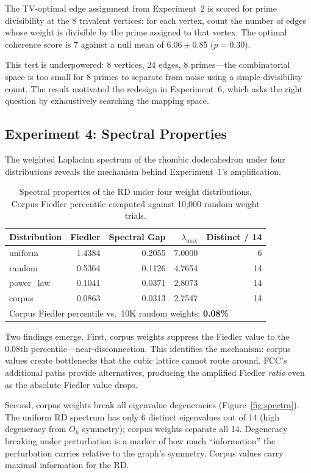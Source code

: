 \documentclass[11pt]{article}
\begin{document}
The TV-optimal edge assignment from Experiment~2 is scored for
prime divisibility at the 8 trivalent vertices: for each vertex,
count the number of edges whose weight is divisible by the prime
assigned to that vertex. The optimal coherence score is 7 against
a null mean of $6.06 \pm 0.85$ ($p = 0.30$).

This test is underpowered: 8 vertices, 24 edges, 8 primes---the
combinatorial space is too small for 8 primes to separate from
noise using a simple divisibility count. The result motivated the
redesign in Experiment~6, which asks the right question by
exhaustively searching the mapping space.

\subsection{Experiment 4: Spectral Properties}

The weighted Laplacian spectrum of the rhombic dodecahedron under
four distributions reveals the mechanism behind
Experiment~1's amplification.

\begin{table}[H]
\centering
\caption{Spectral properties of the RD under four weight
  distributions. Corpus Fiedler percentile computed against 10{,}000
  random weight trials.}
\label{tab:exp4}
\begin{tabular}{lrrrr}
\toprule
Distribution & Fiedler & Spectral Gap & $\lambda_{\max}$ & Distinct / 14 \\
\midrule
uniform    & 1.4384 & 0.2055 & 7.0000 & 6 \\
random     & 0.5364 & 0.1126 & 4.7654 & 14 \\
power\_law  & 0.1041 & 0.0371 & 2.8073 & 14 \\
corpus     & 0.0863 & 0.0313 & 2.7547 & 14 \\
\midrule
\multicolumn{5}{l}{Corpus Fiedler percentile vs.\ 10K random weights: \textbf{0.08\%}} \\
\bottomrule
\end{tabular}
\end{table}

Two findings emerge. First, corpus weights suppress the Fiedler
value to the 0.08th percentile---near-disconnection. This
identifies the mechanism: corpus values create bottlenecks that
the cubic lattice cannot route around. FCC's additional paths
provide alternatives, producing the amplified Fiedler \emph{ratio}
even as the absolute Fiedler value drops.

Second, corpus weights break all eigenvalue degeneracies
(Figure~\ref{fig:spectra}). The uniform RD spectrum has only 6
distinct eigenvalues out of 14 (high degeneracy from $O_h$
symmetry); corpus weights separate all 14. Degeneracy breaking
under perturbation is a marker of how much ``information'' the
perturbation carries relative to the graph's symmetry. Corpus
values carry maximal information for the RD.
\end{document}
